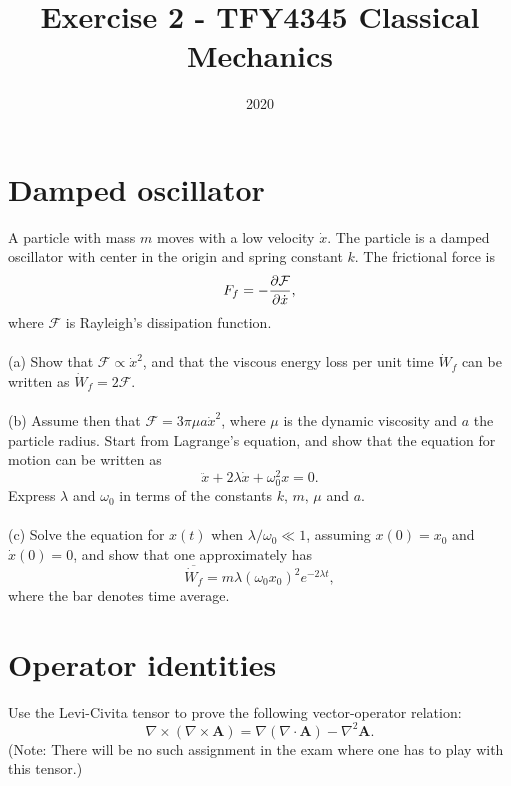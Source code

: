 \documentclass{article}
\title{Exercise 2 - TFY4345 Classical Mechanics}
\date{2020}
\begin{document}
    \maketitle
    \section{Damped oscillator}
        A particle with mass $m$ moves with a low velocity $\dot x$. The particle is a damped oscillator with center in the origin and spring constant $k$. The frictional force is 
        \begin{equation*}
            F_f = - \pdv{\mathcal{F}}{\dot x},
        \end{equation*}
        where $\mathcal{F}$ is Rayleigh's dissipation function. \\ \\
        (a) Show that $\mathcal{F} \propto \dot x^2$, and that the viscous energy loss per unit time $\dot W_f$ can be written as $\dot W_f = 2 \mathcal{F}$. \\ \\
        (b) Assume then that $\mathcal{F} = 3 \pi \mu a \dot x^2$, where $\mu$ is the dynamic viscosity and $a$ the particle radius. Start from Lagrange's equation, and show that the equation for motion can be written as 
        \begin{equation*}
            \ddot x + 2 \lambda \dot x + \omega^2_0 x = 0.
        \end{equation*}
        Express $\lambda$ and $\omega_0$ in terms of the constants $k,\, m,\, \mu $ and $a$.\\ \\
        (c) Solve the equation for $x(t)$ when $\lambda / \omega_0 \ll 1$, assuming $x(0) = x_0$ and $\dot x(0) = 0$, and show that one approximately has 
        \begin{equation*}
            \overline{\dot W_f} = m \lambda \left(\omega_0 x_0\right)^2 e^{-2 \lambda t},
        \end{equation*}
        where the bar denotes time average.
        

    \section{Operator identities}
        Use the Levi-Civita tensor to prove the following vector-operator relation:
        \begin{equation*}
            \nabla \times \left( \nabla \times \mathbf{A} \right) = \nabla \left(\nabla \cdot \mathbf{A}\right) - \nabla^2 \mathbf{A}.
        \end{equation*}
        (Note: There will be no such assignment in the exam where one has to play with this tensor.)
\end{document}
